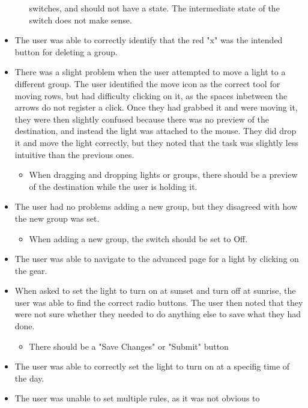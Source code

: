 \documentclass[oneside,openright]{book}
\begin{document}
\begin{itemize}
\begin{itemize}
                switches, and should not have a state. The intermediate state
                of the switch does not make sense.
        \end{itemize}
    \item The user was able to correctly identify that the red "x" was the
        intended button for deleting a group.
    \item There was a slight problem when the user attempted to move a light to
        a different group. The user identified the move icon as the correct
        tool for moving rows, but had difficulty clicking on it, as the spaces
        inbetween the arrows do not register a click. Once they had grabbed it
        and were moving it, they were then slightly confused because there was
        no preview of the destination, and instead the light was attached to
        the mouse. They did drop it and move the light correctly, but they
        noted that the task was slightly less intuitive than the previous ones.
        \begin{itemize}
            \item When dragging and dropping lights or groups, there should be
                a preview of the destination while the user is holding it.
        \end{itemize}
    \item The user had no problems adding a new group, but they disagreed with
        how the new group was set.
        \begin{itemize}
            \item When adding a new group, the switch should be set to Off.
        \end{itemize}
    \item The user was able to navigate to the advanced page for a light by
        clicking on the gear.
    \item When asked to set the light to turn on at sunset and turn off at
        sunrise, the user was able to find the correct radio buttons. The user
        then noted that they were not sure whether they needed to do anything
        else to save what they had done.
        \begin{itemize}
            \item There should be a "Save Changes" or "Submit" button
        \end{itemize}
    \item The user was able to correctly set the light to turn on at a specifig
        time of the day.
    \item The user was unable to set multiple rules, as it was not obvious to

\end{itemize}
\end{document}
